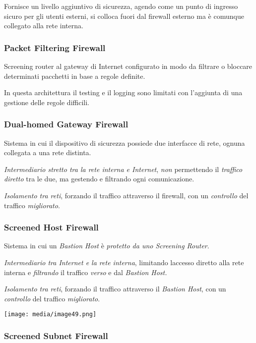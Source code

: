 Fornisce un livello aggiuntivo di sicurezza, agendo come un punto di
ingresso sicuro per gli utenti esterni, si colloca fuori dal firewall
esterno ma è comunque collegato alla rete interna.

\subsubsection{Packet Filtering
Firewall}\label{packet-filtering-firewall}

Screening router al gateway di Internet configurato in modo da filtrare
o bloccare determinati pacchetti in base a regole definite.

In questa architettura il testing e il logging sono limitati con
l'aggiunta di una gestione delle regole difficili.

\subsubsection{Dual-homed Gateway
Firewall}\label{dual-homed-gateway-firewall}

Sistema in cui il dispositivo di sicurezza possiede due interfacce di
rete, ognuna collegata a una rete distinta.

\emph{Intermediario stretto tra la rete interna e Internet}, \emph{non}
permettendo il \emph{traffico diretto} tra le due, ma gestendo e
filtrando ogni comunicazione.

\emph{Isolamento tra reti}, forzando il traffico attraverso il firewall,
con un \emph{controllo} del traffico \emph{migliorato}.

\subsubsection{Screened Host Firewall}\label{screened-host-firewall}

Sistema in cui un \emph{Bastion Host} è \emph{protetto da uno Screening
Router}.

\emph{Intermediario tra Internet e la rete interna}, limitando
l\textquotesingle accesso diretto alla rete interna e \emph{filtrando}
il traffico \emph{verso} e dal \emph{Bastion Host.}

\emph{Isolamento tra reti}, forzando il traffico attraverso il
\emph{Bastion Host}, con un \emph{controllo} del traffico
\emph{migliorato}.

\texttt{[image: media/image49.png]}

\subsubsection{Screened Subnet Firewall}\label{screened-subnet-firewall}

